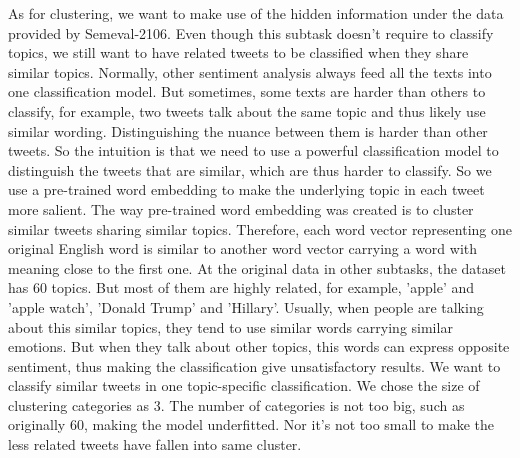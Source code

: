 \documentclass[conference]{IEEEtran}
\begin{document}
As for clustering, we want to make use of the hidden information under the data provided by Semeval-2106. Even though this subtask doesn't require to classify topics, we still want to have related tweets to be classified when they share similar topics. Normally, other sentiment analysis always feed all the texts into one classification model. But sometimes, some texts are harder than others to classify, for example, two tweets talk about the same topic and thus likely use similar wording. Distinguishing the nuance between them is harder than other tweets. So the intuition is that we need to use a powerful classification model to distinguish the tweets that are similar, which are thus harder to classify. So we use a pre-trained word embedding to make the underlying topic in each tweet more salient. The way pre-trained word embedding was created is to cluster similar tweets sharing similar topics. Therefore, each word vector representing one original English word is similar to another word vector carrying a word with meaning close to the first one. At the original data in other subtasks, the dataset has 60 topics. But most of them are highly related, for example, 'apple' and 'apple watch', 'Donald Trump' and 'Hillary'. Usually, when people are talking about this similar topics, they tend to use similar words carrying similar emotions. But when they talk about other topics, this words can express opposite sentiment, thus making the classification give unsatisfactory results. We want to classify similar tweets in one topic-specific classification. We chose the size of clustering categories as 3. The number of categories is not too big, such as originally 60, making the model underfitted. Nor it's not too small to make the less related tweets have fallen into same cluster.


%
%
\end{document}
